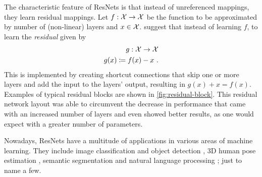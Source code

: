 The characteristic feature of ResNets is that instead of unreferenced mappings, they learn residual mappings.
Let $f: \mathcal{X} \rightarrow \mathcal{X}$ be the function to be approximated by number of (non-linear) layers and $x \in \mathcal{X}$.
\citet{he16} suggest that instead of learning $f$, to learn the \emph{residual} given by
\begin{equation}
	\begin{split}
		g: \mathcal{X} \rightarrow \mathcal{X} \\
		g(x) \coloneqq f(x) - x \ .
	\end{split}
\end{equation}
This is implemented by creating shortcut connections that skip one or more layers and add the input to the layers' output, resulting in $g(x) + x = f(x)$.
Examples of typical residual blocks are shown in \cref{fig:residual-block}.
This residual network layout was able to circumvent the decrease in performance that came with an increased number of layers and even showed better results, as one would expect with a greater number of parameters.



Nowadays, ResNets have a multitude of applications in various areas of machine learning.
They include image classification and object detection \cite{he16}, 3D human pose estimation \cite{drover18}, semantic segmentation and natural language processing \cite{conneau16}; just to name a few.